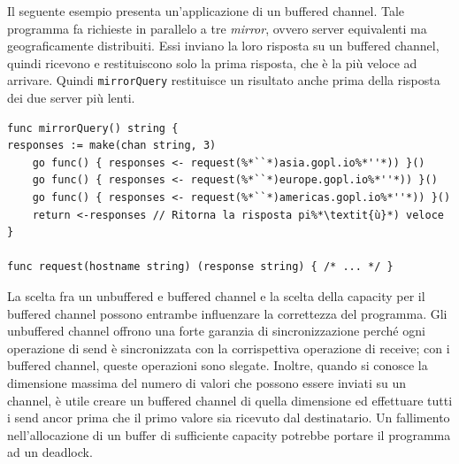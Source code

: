 \documentclass[../../../thesis.tex]{subfiles}
\begin{document}
    Il seguente esempio presenta un'applicazione di un buffered channel.
    Tale programma fa richieste in parallelo a tre \textit{mirror}, ovvero server equivalenti ma geograficamente distribuiti.
    Essi inviano la loro risposta su un buffered channel, quindi ricevono e restituiscono solo la prima risposta, che è la più veloce ad arrivare.
    Quindi \verb"mirrorQuery" restituisce un risultato anche prima della risposta dei due server più lenti.
    \begin{lstlisting}[frame = single, label = {lst:lstlisting7-4-4.7}]
func mirrorQuery() string {
responses := make(chan string, 3)
    go func() { responses <- request(%*``*)asia.gopl.io%*''*)) }()
    go func() { responses <- request(%*``*)europe.gopl.io%*''*)) }()
    go func() { responses <- request(%*``*)americas.gopl.io%*''*)) }()
    return <-responses // Ritorna la risposta pi%*\textit{ù}*) veloce
}

func request(hostname string) (response string) { /* ... */ }
    \end{lstlisting}
    La scelta fra un unbuffered e buffered channel e la scelta della capacity per il buffered channel possono entrambe influenzare la correttezza del programma.
    Gli unbuffered channel offrono una forte garanzia di sincronizzazione perché ogni operazione di send è sincronizzata con la corrispettiva operazione di receive;
    con i buffered channel, queste operazioni sono slegate.
    Inoltre, quando si conosce la dimensione massima del numero di valori che possono essere inviati su un channel, è utile creare un buffered channel di quella dimensione ed effettuare tutti i send ancor prima che il primo valore sia ricevuto dal destinatario.
    Un fallimento nell'allocazione di un buffer di sufficiente capacity potrebbe portare il programma ad un deadlock.
\end{document}
